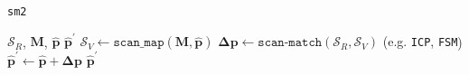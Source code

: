 \begin{algorithm}
  \caption{\texttt{sm2}}
  \begin{spacing}{1.2}
  \begin{algorithmic}[1]
    \REQUIRE $\mathcal{S}_R$, $\bm{M}$, $\hat{\bm{p}}$
    \ENSURE $\hat{\bm{p}}^\prime$
    \STATE $\mathcal{S}_V \leftarrow \texttt{scan\_map}(\bm{M}, \hat{\bm{p}})$
    \STATE $\bm{\Delta p} \leftarrow \texttt{scan-match}(\mathcal{S}_R,\mathcal{S}_V)$ \hfill {\small (e.g. \texttt{ICP}\cite{Vizzo2023}, \texttt{FSM}\cite{Filotheou2022f}})
    \STATE $\hat{\bm{p}}^\prime \leftarrow \hat{\bm{p}} + \bm{\Delta p}$
    \RETURN $\hat{\bm{p}}^\prime$
  \end{algorithmic}
  \end{spacing}
  \label{alg:sm2}
\end{algorithm}



\lipsum[0-2]
